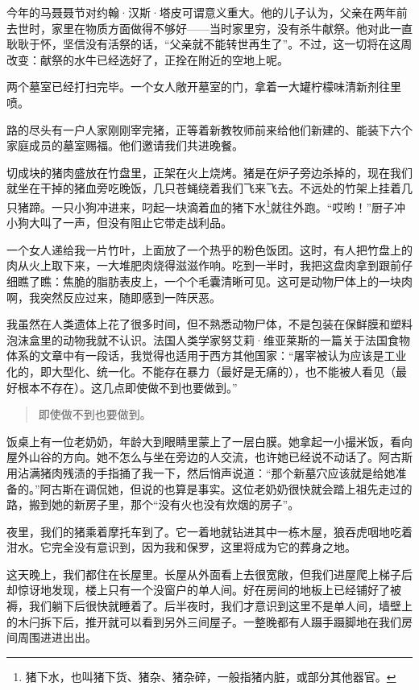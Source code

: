 \documentclass[12pt,oneside]{book}
\begin{document}
\begin{bookref}[frametitle={\cite{好好告别}}]
今年的马聂聂节对约翰·汉斯·塔皮可谓意义重大。他的儿子认为，父亲在两年前去世时，家里在物质方面做得不够好——当时家里穷，没有杀牛献祭。他对此一直耿耿于怀，坚信没有活祭的话，“父亲就不能转世再生了”。不过，这一切将在这周改变：献祭的水牛已经选好了，正拴在附近的空地上呢。

两个墓室已经打扫完毕。一个女人敞开墓室的门，拿着一大罐柠檬味清新剂往里喷。

路的尽头有一户人家刚刚宰完猪，正等着新教牧师前来给他们新建的、能装下六个家庭成员的墓室赐福。他们邀请我们共进晚餐。

切成块的猪肉盛放在竹盘里，正架在火上烧烤。猪是在炉子旁边杀掉的，现在我们就坐在干掉的猪血旁吃晚饭，几只苍蝇绕着我们飞来飞去。不远处的竹架上挂着几只猪蹄。一只小狗冲进来，叼起一块滴着血的猪下水\footnote{猪下水，也叫猪下货、猪杂、猪杂碎，一般指猪内脏，或部分其他器官。}就往外跑。“哎哟！”厨子冲小狗大叫了一声，但没有阻止它带走战利品。

一个女人递给我一片竹叶，上面放了一个热乎的粉色饭团。这时，有人把竹盘上的肉从火上取下来，一大堆肥肉烧得滋滋作响。吃到一半时，我把这盘肉拿到跟前仔细瞧了瞧：焦脆的脂肪表皮上，一个个毛囊清晰可见。这可是动物尸体上的一块肉啊，我突然反应过来，随即感到一阵厌恶。

我虽然在人类遗体上花了很多时间，但不熟悉动物尸体，不是包装在保鲜膜和塑料泡沫盒里的动物我就不认识。法国人类学家努艾莉·维亚莱斯的一篇关于法国食物体系的文章中有一段话，我觉得也适用于西方其他国家：“屠宰被认为应该是工业化的，即大型化、统一化。不能存在暴力（最好是无痛的），也不能被人看见（最好根本不存在）。这几点即使做不到也要做到。”

\begin{quote}
即使做不到也要做到。
\end{quote}

饭桌上有一位老奶奶，年龄大到眼睛里蒙上了一层白膜。她拿起一小撮米饭，看向屋外山谷的方向。她不怎么与坐在旁边的人交流，也许她已经说不动话了。阿古斯用沾满猪肉残渍的手指捅了我一下，然后悄声说道：“那个新墓穴应该就是给她准备的。”阿古斯在调侃她，但说的也算是事实。这位老奶奶很快就会踏上祖先走过的路，搬到她的新房子里，那个“没有火也没有炊烟的房子”。

夜里，我们的猪乘着摩托车到了。它一着地就钻进其中一栋木屋，狼吞虎咽地吃着泔水。它完全没有意识到，因为我和保罗，这里将成为它的葬身之地。

这天晚上，我们都住在长屋里。长屋从外面看上去很宽敞，但我们进屋爬上梯子后却惊讶地发现，楼上只有一个没窗户的单人间。好在房间的地板上已经铺好了被褥，我们躺下后很快就睡着了。后半夜时，我们才意识到这里不是单人间，墙壁上的木闩拆下后，推开就可以看到另外三间屋子。一整晚都有人蹑手蹑脚地在我们房间周围进进出出。


\end{bookref}
\end{document}
